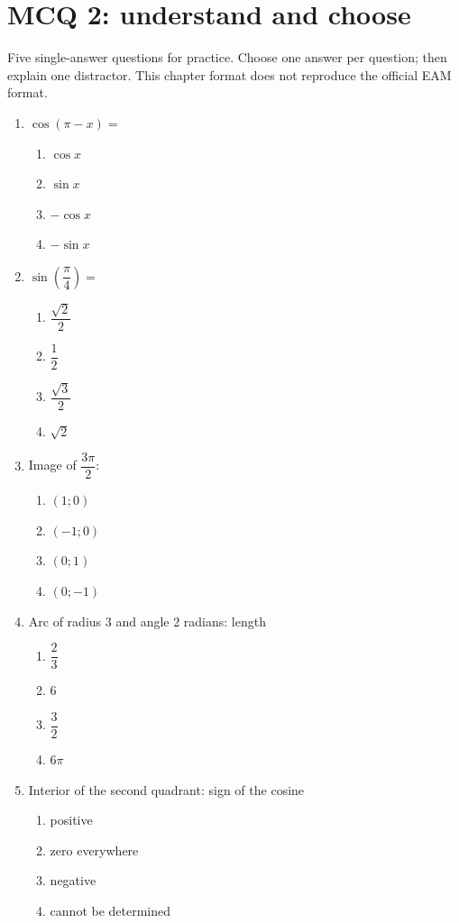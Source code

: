 \endgroup
\begingroup\small
{}\section*{MCQ 2: understand and choose}\label{C10-Q2}
Five single-answer questions for practice. Choose one answer per question; then explain one distractor. This chapter format does not reproduce the official EAM format.
\begin{enumerate}
\item $\cos(\pi-x)=$
\begin{enumerate}[label=\Alph*.,itemsep=2pt]
\item $\cos x$
\item $\sin x$
\item $-\cos x$
\item $-\sin x$
\end{enumerate}
\item $\sin (\dfrac{\pi}{4})=$
\begin{enumerate}[label=\Alph*.,itemsep=2pt]
\item $\dfrac{\sqrt 2}{2}$
\item $\dfrac{1}{2}$
\item $\dfrac{\sqrt 3}{2}$
\item $\sqrt2$
\end{enumerate}
\item Image of $\dfrac{3\pi}{2}$:
\begin{enumerate}[label=\Alph*.,itemsep=2pt]
\item $(1;0)$
\item $(-1;0)$
\item $(0;1)$
\item $(0;-1)$
\end{enumerate}
\item Arc of radius 3 and angle 2 radians: length
\begin{enumerate}[label=\Alph*.,itemsep=2pt]
\item $\dfrac{2}{3}$
\item $6$
\item $\dfrac{3}{2}$
\item $6\pi$
\end{enumerate}
\item Interior of the second quadrant: sign of the cosine
\begin{enumerate}[label=\Alph*.,itemsep=2pt]
\item positive
\item zero everywhere
\item negative
\item cannot be determined
\end{enumerate}
\end{enumerate}
